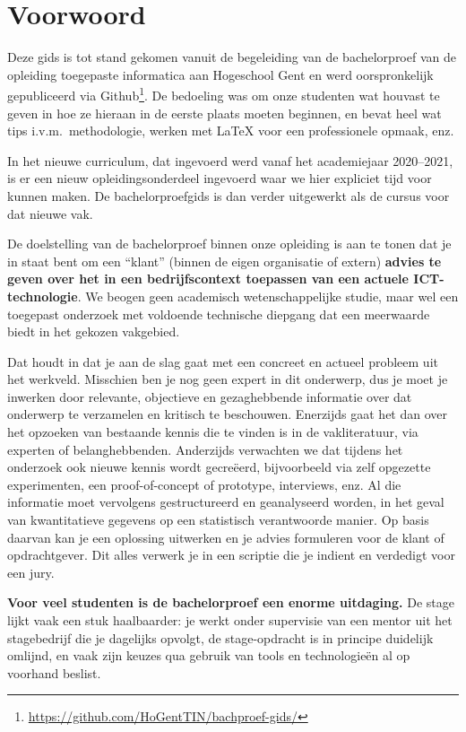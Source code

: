 \chapter*{Voorwoord}%
\label{ch:voorwoord}

Deze gids is tot stand gekomen vanuit de begeleiding van de bachelorproef van de opleiding toegepaste informatica aan Hogeschool Gent en werd oorspronkelijk gepubliceerd via Github\footnote{\url{https://github.com/HoGentTIN/bachproef-gids/}}. De bedoeling was om onze studenten wat houvast te geven in hoe ze hieraan in de eerste plaats moeten beginnen, en bevat heel wat tips i.v.m.\ methodologie, werken met {\LaTeX} voor een professionele opmaak, enz.

In het nieuwe curriculum, dat ingevoerd werd vanaf het academiejaar 2020--2021, is er een nieuw opleidingsonderdeel ingevoerd waar we hier expliciet tijd voor kunnen maken. De bachelorproefgids is dan verder uitgewerkt als de cursus voor dat nieuwe vak.

De doelstelling van de bachelorproef binnen onze opleiding is aan te tonen dat je in staat bent om een ``klant'' (binnen de eigen organisatie of extern) \textbf{advies te geven over het in een bedrijfscontext toepassen van een actuele ICT-technologie}. We beogen geen academisch wetenschappelijke studie, maar wel een toegepast onderzoek met voldoende technische diepgang dat een meerwaarde biedt in het gekozen vakgebied.

Dat houdt in dat je aan de slag gaat met een concreet en actueel probleem uit het werkveld. Misschien ben je nog geen expert in dit onderwerp, dus je moet je inwerken door relevante, objectieve en gezaghebbende informatie over dat onderwerp te verzamelen en kritisch te beschouwen. Enerzijds gaat het dan over het opzoeken van bestaande kennis die te vinden is in de vakliteratuur, via experten of belanghebbenden. Anderzijds verwachten we dat tijdens het onderzoek ook nieuwe kennis wordt gecreëerd, bijvoorbeeld via zelf opgezette experimenten, een proof-of-concept of prototype, interviews, enz. Al die informatie moet vervolgens gestructureerd en geanalyseerd worden, in het geval van kwantitatieve gegevens op een statistisch verantwoorde manier. Op basis daarvan kan je een oplossing uitwerken en je advies formuleren voor de klant of opdrachtgever. Dit alles verwerk je in een scriptie die je indient en verdedigt voor een jury.

\textbf{Voor veel studenten is de bachelorproef een enorme uitdaging.} De stage lijkt vaak een stuk haalbaarder: je werkt onder supervisie van een mentor uit het stagebedrijf die je dagelijks opvolgt, de stage-opdracht is in principe duidelijk omlijnd, en vaak zijn keuzes qua gebruik van tools en technologieën al op voorhand beslist.

